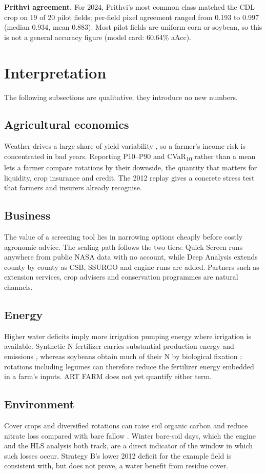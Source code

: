 \documentclass[10pt,twocolumn]{article}
\begin{document}
\textbf{Prithvi agreement.} For 2024, Prithvi's most common class matched the CDL crop on 19 of 20 pilot fields; per-field pixel agreement ranged from 0.193 to 0.997 (median 0.934, mean 0.883). Most pilot fields are uniform corn or soybean, so this is not a general accuracy figure (model card: 60.64\% aAcc).

\section{Interpretation}
The following subsections are qualitative; they introduce no new numbers.

\subsection{Agricultural economics}
Weather drives a large share of yield variability \citep{ray2015,schlenker2009}, so a farmer's income risk is concentrated in bad years. Reporting P10--P90 and CVaR\textsubscript{10} rather than a mean lets a farmer compare rotations by their downside, the quantity that matters for liquidity, crop insurance and credit. The 2012 replay gives a concrete stress test that farmers and insurers already recognise.

\subsection{Business}
The value of a screening tool lies in narrowing options cheaply before costly agronomic advice. The scaling path follows the two tiers: Quick Screen runs anywhere from public NASA data with no account, while Deep Analysis extends county by county as CSB, SSURGO and engine runs are added. Partners such as extension services, crop advisers and conservation programmes are natural channels.

\subsection{Energy}
Higher water deficits imply more irrigation pumping energy where irrigation is available. Synthetic N fertilizer carries substantial production energy and emissions \citep{snyder2009}, whereas soybeans obtain much of their N by biological fixation \citep{salvagiotti2008}; rotations including legumes can therefore reduce the fertilizer energy embedded in a farm's inputs. ART FARM does not yet quantify either term.

\subsection{Environment}
Cover crops and diversified rotations can raise soil organic carbon \citep{poeplau2015,lal2004} and reduce nitrate loss compared with bare fallow \citep{tonitto2006}. Winter bare-soil days, which the engine and the HLS analysis both track, are a direct indicator of the window in which such losses occur. Strategy B's lower 2012 deficit for the example field is consistent with, but does not prove, a water benefit from residue cover.
\end{document}
